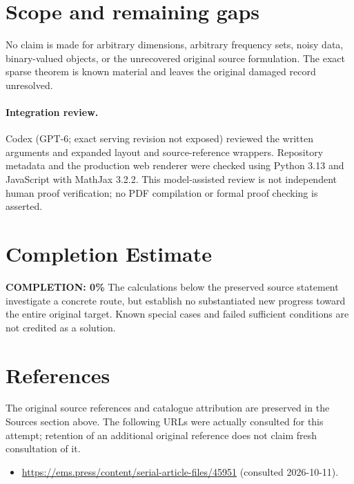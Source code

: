 \documentclass[11pt]{article}
\begin{document}
\section{Scope and remaining gaps}
No claim is made for arbitrary dimensions, arbitrary frequency sets, noisy data, binary-valued objects, or the unrecovered original source formulation. The exact sparse theorem is known material and leaves the original damaged record unresolved.
\paragraph{Integration review.} Codex (GPT-6; exact serving revision not exposed) reviewed the written arguments and expanded layout and source-reference wrappers. Repository metadata and the production web renderer were checked using Python 3.13 and JavaScript with MathJax 3.2.2. This model-assisted review is not independent human proof verification; no PDF compilation or formal proof checking is asserted.

\section{Completion Estimate}
\noindent\textbf{COMPLETION: 0\%}
The calculations below the preserved source statement investigate a concrete route,
but establish no substantiated new progress toward the entire original target.
Known special cases and failed sufficient conditions are not credited as a solution.
\section{References}
The original source references and catalogue attribution are preserved in the
Sources section above. The following URLs were actually consulted for this attempt;
retention of an additional original reference does not claim fresh consultation of it.
\begin{itemize}
\item \url{https://ems.press/content/serial-article-files/45951} (consulted 2026-10-11). 
\end{itemize}
\end{document}
